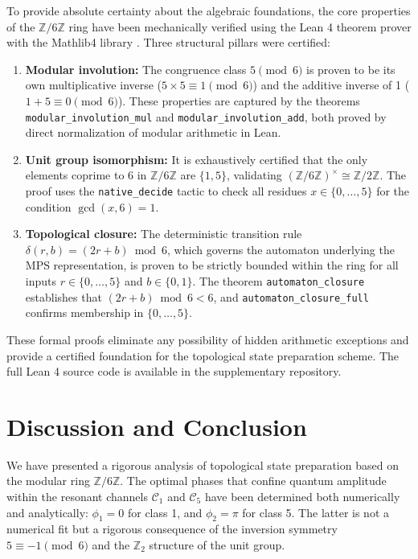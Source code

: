 \documentclass[12pt,a4paper]{article}
\theoremstyle{plain}
\theoremstyle{definition}
\theoremstyle{remark}
\begin{document}
To provide absolute certainty about the algebraic foundations, the core properties of the $\mathbb{Z}/6\mathbb{Z}$ ring have been mechanically verified using the Lean 4 theorem prover with the Mathlib4 library \cite{moura2021lean4, mathlib2020}. Three structural pillars were certified:

\begin{enumerate}
    \item \textbf{Modular involution:} The congruence class $5 \pmod{6}$ is proven to be its own multiplicative inverse ($5 \times 5 \equiv 1 \pmod{6}$) and the additive inverse of 1 ($1 + 5 \equiv 0 \pmod{6}$). These properties are captured by the theorems \texttt{modular\_involution\_mul} and \texttt{modular\_involution\_add}, both proved by direct normalization of modular arithmetic in Lean.
    \item \textbf{Unit group isomorphism:} It is exhaustively certified that the only elements coprime to 6 in $\mathbb{Z}/6\mathbb{Z}$ are $\{1, 5\}$, validating $(\mathbb{Z}/6\mathbb{Z})^{\times} \cong \mathbb{Z}/2\mathbb{Z}$. The proof uses the \texttt{native\_decide} tactic to check all residues $x \in \{0,\dots,5\}$ for the condition $\gcd(x,6)=1$.
    \item \textbf{Topological closure:} The deterministic transition rule $\delta(r, b) = (2r + b) \bmod 6$, which governs the automaton underlying the MPS representation, is proven to be strictly bounded within the ring for all inputs $r \in \{0,\dots,5\}$ and $b \in \{0,1\}$. The theorem \texttt{automaton\_closure} establishes that $(2r+b) \bmod 6 < 6$, and \texttt{automaton\_closure\_full} confirms membership in $\{0,\dots,5\}$.
\end{enumerate}

These formal proofs eliminate any possibility of hidden arithmetic exceptions and provide a certified foundation for the topological state preparation scheme. The full Lean 4 source code is available in the supplementary repository.

\section{Discussion and Conclusion}
\label{sec:conclusion}

We have presented a rigorous analysis of topological state preparation based on the modular ring \(\mathbb{Z}/6\mathbb{Z}\). The optimal phases that confine quantum amplitude within the resonant channels \(\mathcal{C}_1\) and \(\mathcal{C}_5\) have been determined both numerically and analytically: \(\phi_1 = 0\) for class 1, and \(\phi_2 = \pi\) for class 5. The latter is not a numerical fit but a rigorous consequence of the inversion symmetry \(5 \equiv -1 \pmod{6}\) and the \(\mathbb{Z}_2\) structure of the unit group.
\end{document}
